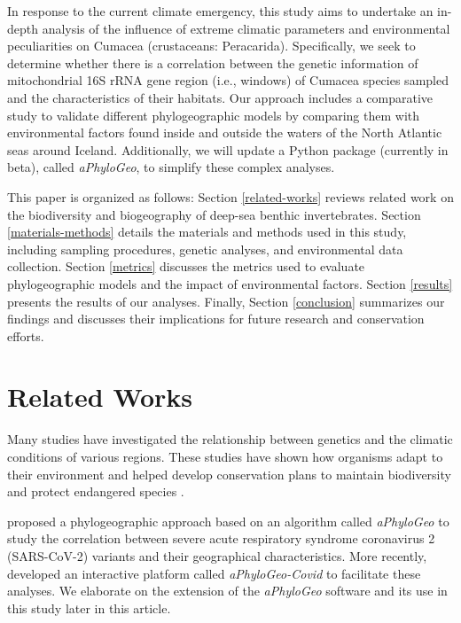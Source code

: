 In response to the current climate emergency, this study aims to undertake an in-depth analysis of the influence of extreme climatic parameters and environmental peculiarities on Cumacea (crustaceans: Peracarida). Specifically, we seek to determine whether there is a correlation between the genetic information of mitochondrial 16S rRNA gene region (i.e., windows) of Cumacea species sampled and the characteristics of their habitats. Our approach includes a comparative study to validate different phylogeographic models by comparing them with environmental factors found inside and outside the waters of the North Atlantic seas around Iceland. Additionally, we will update a Python package (currently in beta), called \textit{aPhyloGeo}, to simplify these complex analyses.

This paper is organized as follows: Section \autoref{related-works} reviews related work on the biodiversity and biogeography of deep-sea benthic invertebrates. Section \autoref{materials-methods} details the materials and methods used in this study, including sampling procedures, genetic analyses, and environmental data collection. Section \autoref{metrics} discusses the metrics used to evaluate phylogeographic models and the impact of environmental factors. Section \autoref{results} presents the results of our analyses. Finally, Section \autoref{conclusion} summarizes our findings and discusses their implications for future research and conservation efforts.

\section{Related Works}\label{related-works}
Many studies have investigated the relationship between genetics and the climatic conditions of various regions. These studies have shown how organisms adapt to their environment \citep{fc_genomic_2012} and helped develop conservation plans to maintain biodiversity and protect endangered species \citep{balkenhol_identifying_2009}.

\cite{koshkarov_phylogeography_2022} proposed a phylogeographic approach based on an algorithm called \textit{aPhyloGeo} to study the correlation between severe acute respiratory syndrome coronavirus 2 (SARS-CoV-2) variants and their geographical characteristics. More recently, \cite{li_aphylogeo-covid_2023} developed an interactive platform called \textit{aPhyloGeo-Covid} to facilitate these analyses. We elaborate on the extension of the \textit{aPhyloGeo} software and its use in this study later in this article.

